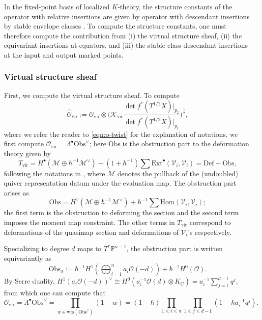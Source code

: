 \documentclass[reqno]{amsart}
\numberwithin{equation}{section}
\numberwithin{equation}{section}
\numberwithin{equation}{section}
\theoremstyle{definition}
\theoremstyle{remark}
\theoremstyle{remark}
\begin{document}
In the fixed-point basis of localized $K$-theory, the structure constants of the operator with relative insertions are given by operator with descendant insertions by stable envelope classes \cite{aganagic-okounkov-bethe}. To compute the structure constants, one must therefore compute the contribution from (i) the virtual structure sheaf, (ii) the equivariant insertions at equators, and (iii) the stable class descendant insertions at the input and output marked points.

\subsubsection{Virtual structure sheaf}
First, we compute the virtual structure sheaf.
To compute
\begin{equation}
    \hat{\mathcal{O}}_{\mathrm{vir}} := \mathcal{O}_{\mathrm{vir}} \otimes \big(\mathcal{K}_{\mathrm{vir}} \frac{\det f^* (T^{1/2}X)|_{p_2}}{\det f^* (T^{1/2}X)|_{p_1}}\big)^{\frac12},
\end{equation}
where we refer the reader to \eqref{eqn:o-twist} for the explanation of notations, we first compute $\mathcal{O}_{\mathrm{vir}} = \Lambda^\bullet \mathrm{Obs}^\vee$; here $\mathrm{Obs}$ is the obstruction part to the deformation theory given by
\begin{equation}
    T_{\mathrm{vir}} = H^\bullet(\mathcal{M} \oplus \hbar^{-1}\mathcal{M}^\vee) - (1+\hbar^{-1}) \sum \mathrm{Ext}^\bullet (\mathcal{V}_i, \mathcal{V}_i) =  \mathrm{Def} - \mathrm{Obs},
\end{equation}
following the notations in \cite[Section 4.3.16]{Oko17}, where $\mathcal{M}$ denotes the pullback of the (undoubled) quiver representation datum under the evaluation map. The obstruction part arises as
\begin{equation}
  \mathrm{Obs} =  H^1(\mathcal{M} \oplus \hbar^{-1}\mathcal{M}^\vee) + \hbar^{-1} \sum \mathrm{Hom}(\mathcal{V}_i, \mathcal{V}_i);
\end{equation}
the first term is the obstruction to deforming the section and the second term imposes the moment map constraint. The other terms in $T_\mathrm{vir}$ correspond to deformations of the quasimap section and deformations of $\mathcal{V}_i$'s respectively.

Specializing to degree $d$ maps to $T^*\mathbb{P}^{n-1}$, the obstruction part is written equivariantly as
\begin{equation}
    \mathrm{Obs}_d := \hbar^{-1}H^1\left( \bigoplus_{i=1}^n a_i\mathcal{O}(-d) \right) + \hbar^{-1} H^0(\mathcal{O}).
\end{equation}
By Serre duality, $H^1(a_i \mathcal{O}(-d))^\vee \cong H^0(a_i^{-1} \mathcal{O}(d) \otimes K_C) = a_i^{-1} \sum_{j=1}^{d-1} q^j$, from which one can compute that
\begin{equation}
    \mathcal{O}_{\mathrm{vir}} = \Lambda^\bullet \mathrm{Obs}^\vee = \prod_{w \in \mathrm{wts}(\mathrm{Obs}^\vee)} (1-w)= (1-\hbar) \prod_{1 \le i \le n} \prod_{ 1 \le j \le d-1} (1-\hbar a_i^{-1}q^j).
\end{equation}
\end{document}
